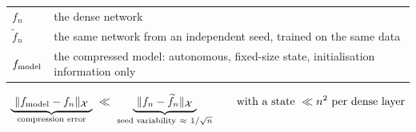 \documentclass[12pt,border=2pt]{standalone}
\begin{document}
\begin{minipage}{6.9in}
\renewcommand{\arraystretch}{1.3}
\begin{tabular}{@{}l@{\quad}l@{}}
 $f_n$ & the dense network\\
 $\widetilde f_n$ & the same network from an independent seed, trained on the same data\\
 $f_{\rm model}$ & the compressed model: autonomous, fixed-size state, initialisation information only
\end{tabular}
\[
 \underbrace{\ \|f_{\rm model}-f_n\|_{\mathcal X}\ }_{\text{compression error}}
 \ \ll\
 \underbrace{\ \|f_n-\widetilde f_n\|_{\mathcal X}\ }_{\text{seed variability}\ \approx\ 1/\sqrt n}
 \qquad\text{with a state}\ \ll n^2\ \text{per dense layer}
\]
\end{minipage}
\end{document}
